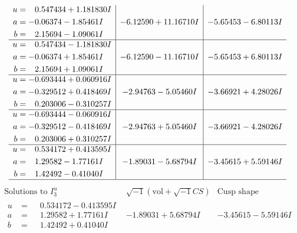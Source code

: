 \documentclass[1p]{elsarticle_modified}
\theoremstyle{definition}
\newcommand{\I}{\sqrt{-1}}
\begin{document}
$$\begin{array}{c|c|c}
\begin{aligned}
u &= \phantom{-}0.547434 + 1.181830 I \\
a &= -0.06374 - 1.85461 I \\
b &= \phantom{-}2.15694 - 1.09061 I\end{aligned}
 & -6.12590 + 11.16710 I & -5.65453 - 6.80113 I \\ \hline\begin{aligned}
u &= \phantom{-}0.547434 - 1.181830 I \\
a &= -0.06374 + 1.85461 I \\
b &= \phantom{-}2.15694 + 1.09061 I\end{aligned}
 & -6.12590 - 11.16710 I & -5.65453 + 6.80113 I \\ \hline\begin{aligned}
u &= -0.693444 + 0.060916 I \\
a &= -0.329512 + 0.418469 I \\
b &= \phantom{-}0.203006 - 0.310257 I\end{aligned}
 & -2.94763 - 5.05460 I & -3.66921 + 4.28026 I \\ \hline\begin{aligned}
u &= -0.693444 - 0.060916 I \\
a &= -0.329512 - 0.418469 I \\
b &= \phantom{-}0.203006 + 0.310257 I\end{aligned}
 & -2.94763 + 5.05460 I & -3.66921 - 4.28026 I \\ \hline\begin{aligned}
u &= \phantom{-}0.534172 + 0.413595 I \\
a &= \phantom{-}1.29582 - 1.77161 I \\
b &= \phantom{-}1.42492 - 0.41040 I\end{aligned}
 & -1.89031 - 5.68794 I & -3.45615 + 5.59146 I\\
 \hline 
 \end{array}$$\newpage$$\begin{array}{c|c|c}  
\text{Solutions to }I^u_{3}& \I (\text{vol} + \sqrt{-1}CS) & \text{Cusp shape}\\
 \hline 
\begin{aligned}
u &= \phantom{-}0.534172 - 0.413595 I \\
a &= \phantom{-}1.29582 + 1.77161 I \\
b &= \phantom{-}1.42492 + 0.41040 I\end{aligned}
 & -1.89031 + 5.68794 I & -3.45615 - 5.59146 I \\ \hline\begin{aligned}

\end{aligned}
\end{array}$$
\end{document}
